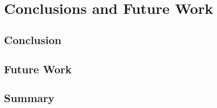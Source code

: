 \chapter{Conclusions and Future Work}
\label{chp:conclusion}

\section{Conclusion}

\section{Future Work}
\label{sec:future-work}

\section{Summary}
